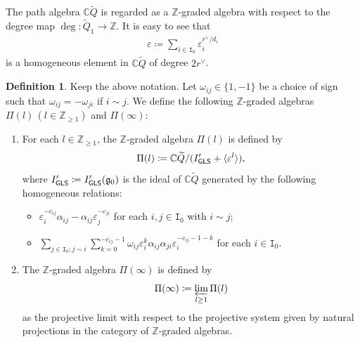 \documentclass[12pt]{amsart}
\theoremstyle{definition}
\newtheorem{definition}[theorem]{Definition}
\theoremstyle{remark}
\numberwithin{equation}{section}
\newcommand{\GLS}{{\sf GLS}}
\begin{document}
The path algebra $\mathbb{C}\widetilde{Q}$ is regarded as a $\mathbb{Z}$-graded algebra with respect to the degree map  $\deg\colon \widetilde{Q}_1 \to \mathbb{Z}$. It is easy to see that
\begin{eqnarray}\label{eqn:silon}
   \varepsilon\coloneqq \sum_{i\in \mathtt{I}_0}\varepsilon_i^{r^\vee /d_i}  
\end{eqnarray}
is a homogeneous element in $\mathbb{C}\widetilde{Q}$ of degree $2r^\vee$. 


\begin{definition}\label{def:GLS2}
    Keep the above notation.  Let $\omega_{ij}\in \{1, -1\}$ be a choice of sign such that $\omega_{ij}= -\omega_{ji}$ if $i\sim j$. We define the following $\mathbb{Z}$-graded algebras $\Pi(l)\,(l\in \mathbb{Z}_{\geq 1})$ and $\Pi(\infty)$:
    \begin{enumerate}
        \item[(i)]\label{eq:GLS2_1} For each $l \in \mathbb{Z}_{\geq 1}$, the $\mathbb{Z}$-graded algebra $\Pi(l)$ is defined by
    \[\Pi(l)\coloneqq \mathbb{C}\widetilde{Q}/( I'_{\GLS} +\langle\varepsilon^l\rangle),\]
    where $I'_{\GLS}\coloneqq I'_{\GLS}(\mathfrak{g}_0)$ is the ideal of $\mathbb{C}\widetilde{Q}$ generated by the following homogeneous relations:
    \begin{itemize}
        \item[(R1)] $\varepsilon_i^{-c_{ij}}\alpha_{ij}-\alpha_{ij}\varepsilon_j^{-c_{ji}}$ for each $i,j \in \mathtt{I}_0$ with $i\sim j$;
        \item[(R2)] $\sum_{j\in \mathtt{I}_0; j\sim i}\sum_{k=0}^{-c_{ij}-1}\omega_{ij}\varepsilon_i^k\alpha_{ij}\alpha_{ji}\varepsilon_i^{-c_{ij}-1-k}$ for each $i\in \mathtt{I}_0$.
    \end{itemize}
    \item[(ii)]\label{eq:GLS2_2} The $\mathbb{Z}$-graded algebra $\Pi(\infty)$ is defined by
    \[\Pi(\infty)\coloneqq \varprojlim_{l\geq 1} \Pi(l)\]
    as the projective limit with respect to the projective system given by natural projections in the category of $\mathbb{Z}$-graded algebras.
    \end{enumerate}
\end{definition}
\end{document}
